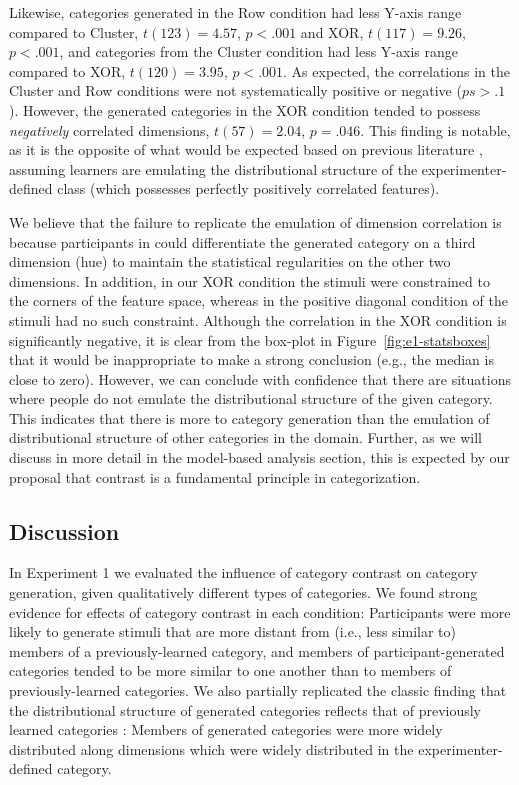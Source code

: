 \documentclass[pdflatex,sn-apa]{sn-jnl}%
\theoremstyle{thmstyleone}%
\theoremstyle{thmstyletwo}%
\theoremstyle{thmstylethree}%
\begin{document}
Likewise, categories generated in the Row condition had less Y-axis range
compared to Cluster, $t(123) = 4.57$, $p < .001$ and XOR, $t(117) = 9.26$, $p <
.001$, and categories from the Cluster condition had less Y-axis range compared
to XOR, $t(120) = 3.95$, $p < .001$. As expected, the correlations in the
Cluster and Row conditions were not systematically positive or negative ($ps >
.1$). However, the generated categories in the XOR condition tended to possess
{\em negatively} correlated dimensions, $t(57) = 2.04$, $p = .046$. This
finding is notable, as it is the opposite of what would be expected based on previous literature \citep{jern2013probabilistic}, assuming
learners are emulating the distributional structure of the experimenter-defined
class (which possesses perfectly positively correlated features).

We believe that the failure to replicate the emulation of dimension correlation is
because participants in \cite{jern2013probabilistic} could differentiate the
generated category on a third dimension (hue) to maintain the statistical
regularities on the other two dimensions. In addition, in our XOR condition the
stimuli were constrained to the corners of the feature space, whereas in the
positive diagonal condition of \cite{jern2013probabilistic} the stimuli had no
such constraint. Although the correlation in the XOR condition is significantly
negative, it is clear from the box-plot in Figure~\ref{fig:e1-statsboxes} that
it would be inappropriate to make a strong conclusion (e.g., the median is close
to zero). However, we can conclude with confidence that there are situations
where people do not emulate the distributional structure of the given category.
This indicates that there is more to category generation than the emulation of
distributional structure of other categories in the domain. Further, as we will
discuss in more detail in the model-based analysis section, this is expected by
our proposal that contrast is a fundamental principle in categorization.


\subsection{Discussion} In Experiment 1 we evaluated the influence of category
contrast on category generation, given qualitatively different types of
categories. We found strong evidence for effects of category contrast in each
condition: Participants were more likely to generate stimuli that are more
distant from (i.e., less similar to) members of a previously-learned category,
and members of participant-generated categories tended to be more similar to one
another than to members of previously-learned categories. We also partially
replicated the classic finding that the distributional structure of generated
categories reflects that of previously learned categories
\citep{jern2013probabilistic,ward1994structured}: Members of generated
categories were more widely distributed along dimensions which were widely
distributed in the experimenter-defined category.
\end{document}
